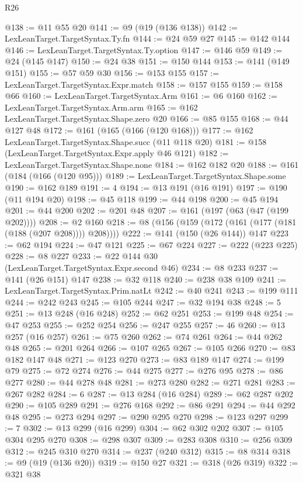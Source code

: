 \begin{lexlean}{R26}
\begin{coremodule}
@138 := @11 @55 @20
@141 := @9 (@19 (@136 @138))
@142 := LexLeanTarget.TargetSyntax.Ty.fn
@144 := @24 @59 @27
@145 := @142 @144
@146 := LexLeanTarget.TargetSyntax.Ty.option
@147 := @146 @59
@149 := @24 (@145 @147)
@150 := @24 @38
@151 := @150 @144
@153 := @141 (@149 @151)
@155 := @57 @59 @30
@156 := @153 @155
@157 := LexLeanTarget.TargetSyntax.Expr.match
@158 := @157 @155
@159 := @158 @66
@160 := LexLeanTarget.TargetSyntax.Arm
@161 := @6 @160
@162 := LexLeanTarget.TargetSyntax.Arm.arm
@165 := @162 LexLeanTarget.TargetSyntax.Shape.zero @20
@166 := @85 @155
@168 := @44 @127 @48
@172 := @161 (@165 (@166 (@120 @168)))
@177 := @162 LexLeanTarget.TargetSyntax.Shape.succ (@11 @118 @20)
@181 := @158 (LexLeanTarget.TargetSyntax.Expr.apply @46 @121)
@182 := LexLeanTarget.TargetSyntax.Shape.none
@184 := @162 @182 @20
@188 := @161 (@184 (@166 (@120 @95)))
@189 := LexLeanTarget.TargetSyntax.Shape.some
@190 := @162 @189
@191 := 4
@194 := @13 @191 (@16 @191)
@197 := @190 (@11 @194 @20)
@198 := @45 @118
@199 := @44 @198
@200 := @45 @194
@201 := @44 @200
@202 := @201 @48
@207 := @161 (@197 (@63 (@47 (@199 @202))))
@208 := @2 @160
@218 := @8 (@156 (@159 (@172 (@161 (@177 (@181 (@188 (@207 @208)))) @208))))
@222 := @141 (@150 (@26 @144)) @147
@223 := @62 @194
@224 := @47 @121
@225 := @67 @224
@227 := @222 (@223 @225)
@228 := @8 @227
@233 := @22 @144 @30 (LexLeanTarget.TargetSyntax.Expr.second @46)
@234 := @8 @233
@237 := @141 (@26 @151) @147
@238 := @32 @118
@240 := @238 @38 @109
@241 := LexLeanTarget.TargetSyntax.Prim.natLt
@242 := @40 @241
@243 := @199 @111
@244 := @242 @243
@245 := @105 @244
@247 := @32 @194 @38
@248 := 5
@251 := @13 @248 (@16 @248)
@252 := @62 @251
@253 := @199 @48
@254 := @47 @253
@255 := @252 @254
@256 := @247 @255
@257 := 46
@260 := @13 @257 (@16 @257)
@261 := @75 @260
@262 := @74 @261
@264 := @44 @262 @48
@265 := @201 @264
@266 := @107 @265
@267 := @105 @266
@270 := @83 @182 @147 @48
@271 := @123 @270
@273 := @83 @189 @147
@274 := @199 @79
@275 := @72 @274
@276 := @44 @275
@277 := @276 @95
@278 := @86 @277
@280 := @44 @278 @48
@281 := @273 @280
@282 := @271 @281
@283 := @267 @282
@284 := 6
@287 := @13 @284 (@16 @284)
@289 := @62 @287 @202
@290 := @105 @289
@291 := @276 @168
@292 := @86 @291
@294 := @44 @292 @48
@295 := @273 @294
@297 := @290 @295 @270
@298 := @123 @297
@299 := 7
@302 := @13 @299 (@16 @299)
@304 := @62 @302 @202
@307 := @105 @304 @295 @270
@308 := @298 @307
@309 := @283 @308
@310 := @256 @309
@312 := @245 @310 @270
@314 := @237 (@240 @312)
@315 := @8 @314
@318 := @9 (@19 (@136 @20))
@319 := @150 @27
@321 := @318 (@26 @319)
@322 := @321 @38

\end{coremodule}
\end{lexlean}
